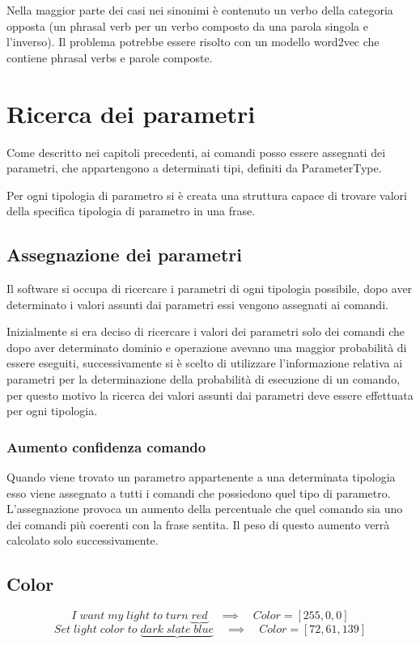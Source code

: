\documentclass[twoside]{supsistudent}
\begin{document}
Nella maggior parte dei casi nei sinonimi è contenuto un verbo della categoria opposta (un phrasal verb per un verbo composto da una parola singola e l'inverso).
Il problema potrebbe essere risolto con un modello word2vec che contiene phrasal verbs e parole composte.

\chapter{Ricerca dei parametri}
Come descritto nei capitoli precedenti, ai comandi posso essere assegnati dei parametri, che appartengono a determinati tipi, definiti da ParameterType.

Per ogni tipologia di parametro si è creata una struttura capace di trovare valori della specifica tipologia di parametro in una frase.
\section{Assegnazione dei parametri}
Il software si occupa di ricercare i parametri di ogni tipologia possibile, dopo aver determinato i valori assunti dai parametri essi vengono assegnati ai comandi.

Inizialmente si era deciso di ricercare i valori dei parametri solo dei comandi che dopo aver determinato dominio e operazione avevano una maggior probabilità di essere eseguiti, successivamente si è scelto di utilizzare l'informazione relativa ai parametri per la determinazione della probabilità di esecuzione di un comando, per questo motivo la ricerca dei valori assunti dai parametri deve essere effettuata per ogni tipologia.
\subsection{Aumento confidenza comando}
Quando viene trovato un parametro appartenente a una determinata tipologia esso viene assegnato a tutti i comandi che possiedono quel tipo di parametro. L'assegnazione provoca un aumento della percentuale che quel comando sia uno dei comandi più coerenti con la frase sentita. Il peso di questo aumento verrà calcolato solo successivamente.
\newpage{}
\section{Color}
\begin{center}
\[
I\;want\;my\;light\;to\;turn\;
\underbrace{red}
\quad\implies\quad Color = [255,0,0]
\]
\[
Set\;light\;color\;to\;
\underbrace{dark\;slate\;blue}
\quad\implies\quad Color = [72,61,139]
\]
\end{center}
\end{document}
